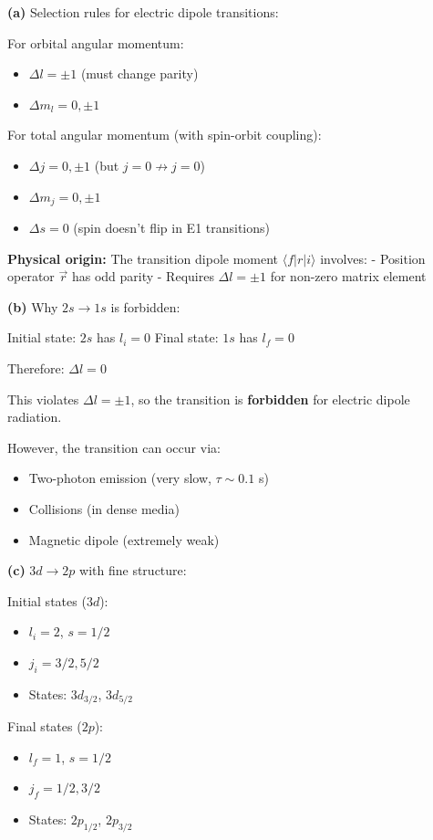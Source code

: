 \documentclass[12pt,a4paper]{article}
\begin{document}
\begin{solution}
\textbf{(a)} Selection rules for electric dipole transitions:

For orbital angular momentum:
\begin{itemize}
    \item $\Delta l = \pm 1$ (must change parity)
    \item $\Delta m_l = 0, \pm 1$
\end{itemize}

For total angular momentum (with spin-orbit coupling):
\begin{itemize}
    \item $\Delta j = 0, \pm 1$ (but $j=0 \not\to j=0$)
    \item $\Delta m_j = 0, \pm 1$
    \item $\Delta s = 0$ (spin doesn't flip in E1 transitions)
\end{itemize}

\textbf{Physical origin:} The transition dipole moment $\langle f|r|i \rangle$ involves:
- Position operator $\vec{r}$ has odd parity
- Requires $\Delta l = \pm 1$ for non-zero matrix element

\textbf{(b)} Why $2s \to 1s$ is forbidden:

Initial state: $2s$ has $l_i = 0$
Final state: $1s$ has $l_f = 0$

Therefore: $\Delta l = 0$

This violates $\Delta l = \pm 1$, so the transition is \textbf{forbidden} for electric dipole radiation.

However, the transition can occur via:
\begin{itemize}
    \item Two-photon emission (very slow, $\tau \sim 0.1$ s)
    \item Collisions (in dense media)
    \item Magnetic dipole (extremely weak)
\end{itemize}

\textbf{(c)} $3d \to 2p$ with fine structure:

Initial states ($3d$):
\begin{itemize}
    \item $l_i = 2$, $s = 1/2$
    \item $j_i = 3/2, 5/2$
    \item States: $3d_{3/2}$, $3d_{5/2}$
\end{itemize}

Final states ($2p$):
\begin{itemize}
    \item $l_f = 1$, $s = 1/2$
    \item $j_f = 1/2, 3/2$
    \item States: $2p_{1/2}$, $2p_{3/2}$
\end{itemize}


\end{solution}
\end{document}
